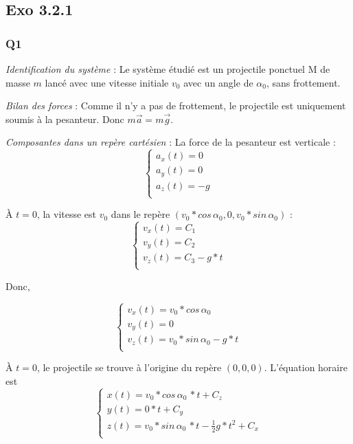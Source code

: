 \documentclass[]{book}
\theoremstyle{definition}
\begin{document}
\subsection*{Exo 3.2.1}
	
\subsubsection*{Q1}
\emph{Identification du syst\`eme} : Le syst\`eme \'etudi\'e est un projectile ponctuel M de masse $m$ lanc\'e avec une vitesse initiale $v_0$ avec un angle de $\alpha_0$, sans frottement. 


\emph{Bilan des forces} : Comme il n'y a pas de frottement, le projectile est uniquement soumis \`a la pesanteur. Donc $m \overrightarrow{a} = m \overrightarrow{g}$.
 

\emph{Composantes dans un rep\`ere cart\'esien} : 
 La force de la pesanteur est verticale :
$$
\left\{
\begin{array}{l}
 a_x(t) = 0 \\
 a_y(t) = 0 \\
 a_z(t) = - g \\
\end{array}
\right. 
$$

\`A $t=0$, la vitesse est $v_0$ dans le rep\`ere $(v_0*cos\, \alpha_0, 0, v_0*sin\, \alpha_0)$ :
$$
\left\{
\begin{array}{l}
 v_x(t) = C_1 \\
 v_y(t) = C_2 \\
 v_z(t) = C_3 - g*t \\
\end{array}
\right. 
$$

Donc, 

$$
\left\{
\begin{array}{l}
 v_x(t) = v_0*cos\, \alpha_0 \\
 v_y(t) = 0 \\
 v_z(t) = v_0*sin\, \alpha_0 - g*t \\
\end{array}
\right. 
$$

\`A $t=0$, le projectile se trouve \`a l'origine du rep\`ere $(0,0,0)$. L'\'equation horaire est
$$
\left\{
\begin{array}{l}
 x(t) = v_0*cos\, \alpha_0\, *t + C_z\\
 y(t) = 0*t + C_y \\
 z(t) = v_0*sin\, \alpha_0\, *t - \frac{1}{2}g*t^2 + C_x\\
\end{array}
\right. 
$$
\end{document}

